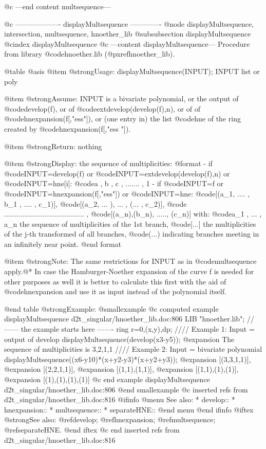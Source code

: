 @c ---end content multsequence---

@c ------------------- displayMultsequence -------------
@node displayMultsequence, intersection, multsequence, hnoether_lib
@subsubsection displayMultsequence
@cindex displayMultsequence
@c ---content displayMultsequence---
Procedure from library @code{hnoether.lib} (@pxref{hnoether_lib}).

@table @asis
@item @strong{Usage:}
displayMultsequence(INPUT); INPUT list or poly

@item @strong{Assume:}
INPUT is a bivariate polynomial, or the output of @code{develop(f)},
or of @code{extdevelop(develop(f),n)}, or of of @code{hnexpansion(f[,"ess"])},
or (one entry in) the list @code{hne} of the ring created by @code{hnexpansion(f[,"ess "])}.

@item @strong{Return:}
nothing

@item @strong{Display:}
the sequence of multiplicities:
@format
 - if @code{INPUT=develop(f)} or @code{INPUT=extdevelop(develop(f),n)} or @code{INPUT=hne[i]}:
                      @code{a , b , c , ....... , 1}
 - if @code{INPUT=f} or @code{INPUT=hnexpansion(f[,"ess"])} or @code{INPUT=hne}:
                      @code{[(a_1, .... , b_1 , .... , c_1)],}
                      @code{[(a_2, ... ), ... , (... , c_2)],}
                      @code{ ........................................ ,}
                      @code{[(a_n),(b_n), ....., (c_n)]}
     with:
       @code{a_1 , ... , a_n} the sequence of multiplicities of the 1st branch,
       @code{[...]} the multiplicities of the j-th transformed of all branches,
       @code{(...)} indicating branches meeting in an infinitely near point.
@end format

@item @strong{Note:}
The same restrictions for INPUT as in @code{multsequence} apply.@*
In case the Hamburger-Noether expansion of the curve f is needed
for other purposes as well it is better to calculate this first
with the aid of @code{hnexpansion} and use it as input instead of
the polynomial itself.

@end table
@strong{Example:}
@smallexample
@c computed example displayMultsequence d2t_singular/hnoether_lib.doc:806 
LIB "hnoether.lib";
// ------ the example starts here -------
ring r=0,(x,y),dp;
//// Example 1: Input = output of develop
displayMultsequence(develop(x3-y5));
@expansion{} The sequence of multiplicities is   3,2,1,1
//// Example 2: Input = bivariate polynomial
displayMultsequence((x6-y10)*(x+y2-y3)*(x+y2+y3));
@expansion{} [(3,3,1,1)],
@expansion{} [(2,2,1,1)],
@expansion{} [(1,1),(1,1)],
@expansion{} [(1,1),(1),(1)],
@expansion{} [(1),(1),(1),(1)]
@c end example displayMultsequence d2t_singular/hnoether_lib.doc:806
@end smallexample
@c inserted refs from d2t_singular/hnoether_lib.doc:816
@ifinfo
@menu
See also:
* develop::
* hnexpansion::
* multsequence::
* separateHNE::
@end menu
@end ifinfo
@iftex
@strong{See also:}
@ref{develop};
@ref{hnexpansion};
@ref{multsequence};
@ref{separateHNE}.
@end iftex
@c end inserted refs from d2t_singular/hnoether_lib.doc:816

